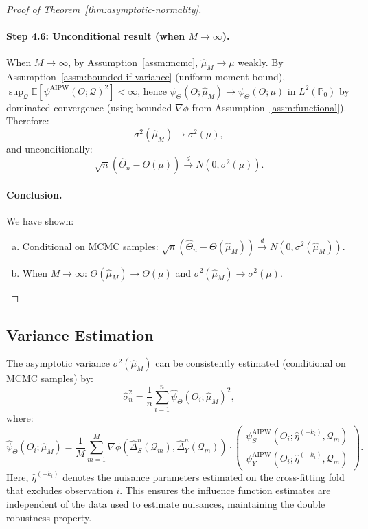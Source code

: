 \begin{proof}[Proof of Theorem~\ref{thm:asymptotic-normality}]
\paragraph{Step 4.6: Unconditional result (when $M \to \infty$).}
When $M \to \infty$, by Assumption~\ref{assm:mcmc}, $\hat{\mu}_M \to \mu$ weakly. By Assumption~\ref{assm:bounded-if-variance} (uniform moment bound), $\sup_{\mathcal{Q}} \mathbb{E}[\psi^{\text{AIPW}}(O; \mathcal{Q})^2] < \infty$, hence $\psi_\Theta(O; \hat{\mu}_M) \to \psi_\Theta(O; \mu)$ in $L^2(\mathbb{P}_0)$ by dominated convergence (using bounded $\nabla\phi$ from Assumption~\ref{assm:functional}). Therefore:
\begin{equation}
\sigma^2(\hat{\mu}_M) \to \sigma^2(\mu),
\end{equation}
and unconditionally:
\begin{equation}
\sqrt{n}(\hat{\Theta}_n - \Theta(\mu)) \xrightarrow{d} N(0, \sigma^2(\mu)).
\end{equation}

\paragraph{Conclusion.}
We have shown:
\begin{enumerate}[(a)]
\item Conditional on MCMC samples: $\sqrt{n}(\hat{\Theta}_n - \Theta(\hat{\mu}_M)) \xrightarrow{d} N(0, \sigma^2(\hat{\mu}_M))$.
\item When $M \to \infty$: $\Theta(\hat{\mu}_M) \to \Theta(\mu)$ and $\sigma^2(\hat{\mu}_M) \to \sigma^2(\mu)$.
\end{enumerate}
\end{proof}

\subsection{Variance Estimation}

The asymptotic variance $\sigma^2(\hat{\mu}_M)$ can be consistently estimated (conditional on MCMC samples) by:
\begin{equation}
\hat{\sigma}^2_n = \frac{1}{n}\sum_{i=1}^n \hat{\psi}_\Theta(O_i; \hat{\mu}_M)^2,
\end{equation}
where:
\begin{equation}
\hat{\psi}_\Theta(O_i; \hat{\mu}_M) = \frac{1}{M}\sum_{m=1}^M \nabla\phi(\hat{\Delta}_S^n(\mathcal{Q}_m), \hat{\Delta}_Y^n(\mathcal{Q}_m)) \cdot \begin{pmatrix} \psi_S^{\text{AIPW}}(O_i; \hat{\eta}^{(-k_i)}, \mathcal{Q}_m) \\ \psi_Y^{\text{AIPW}}(O_i; \hat{\eta}^{(-k_i)}, \mathcal{Q}_m) \end{pmatrix}.
\end{equation}
Here, $\hat{\eta}^{(-k_i)}$ denotes the nuisance parameters estimated on the cross-fitting fold that excludes observation $i$. This ensures the influence function estimates are independent of the data used to estimate nuisances, maintaining the double robustness property.

